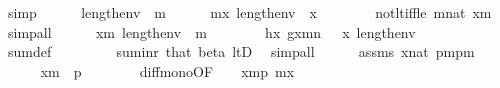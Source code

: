 \begin{isabellebody}
\ simp\isanewline
\ \ \ \ \isamarkupfalse%
\ {\isacartoucheopen}length{\isacharparenleft}{\kern0pt}env{\isacharparenright}{\kern0pt}\ {\isacharequal}{\kern0pt}\ m{\isacartoucheclose}\isanewline
\ \ \ \ \isamarkupfalse%
\ {\isachardoublequoteopen}m{\isasymle}x{\isachardoublequoteclose}\ {\isachardoublequoteopen}length{\isacharparenleft}{\kern0pt}env{\isacharparenright}{\kern0pt}\ {\isasymle}\ x{\isachardoublequoteclose}\isanewline
\ \ \ \ \ \ \isamarkupfalse%
\ not{\isacharunderscore}{\kern0pt}lt{\isacharunderscore}{\kern0pt}iff{\isacharunderscore}{\kern0pt}le\ {\isacartoucheopen}m{\isasymin}nat{\isacartoucheclose}\ {\isacartoucheopen}{\isasymnot}x{\isacharless}{\kern0pt}m{\isacartoucheclose}\ \isamarkupfalse%
\ simp{\isacharunderscore}{\kern0pt}all\isanewline
\ \ \ \ \isamarkupfalse%
\ {\isacartoucheopen}{\isasymnot}x{\isacharless}{\kern0pt}m{\isacartoucheclose}\ {\isacartoucheopen}length{\isacharparenleft}{\kern0pt}env{\isacharparenright}{\kern0pt}\ {\isacharequal}{\kern0pt}\ m{\isacartoucheclose}\isanewline
\ \ \ \ \isamarkupfalse%
\ {}\ {\isacharcolon}{\kern0pt}\ {\isachardoublequoteopen}{\isacharquery}{\kern0pt}h{\isacharbackquote}{\kern0pt}x{\isacharequal}{\kern0pt}\ g{\isacharbackquote}{\kern0pt}{\isacharparenleft}{\kern0pt}x{\isacharhash}{\kern0pt}{\isacharminus}{\kern0pt}m{\isacharparenright}{\kern0pt}{\isacharhash}{\kern0pt}{\isacharplus}{\kern0pt}n{\isachardoublequoteclose}\ \ {\isachardoublequoteopen}{\isasymnot}\ x\ {\isacharless}{\kern0pt}length{\isacharparenleft}{\kern0pt}env{\isacharparenright}{\kern0pt}{\isachardoublequoteclose}\isanewline
\ \ \ \ \ \ \isamarkupfalse%
\ sum{\isacharunderscore}{\kern0pt}def\isanewline
\ \ \ \ \ \ \isamarkupfalse%
\ \ sum{\isacharunderscore}{\kern0pt}inr\ that\ beta\ ltD\ \isamarkupfalse%
\ simp{\isacharunderscore}{\kern0pt}all\isanewline
\ \ \ \ \isamarkupfalse%
\ assms\ {\isacartoucheopen}x{\isasymin}nat{\isacartoucheclose}\ {\isacartoucheopen}p{\isacharequal}{\kern0pt}m{\isacharhash}{\kern0pt}{\isacharplus}{\kern0pt}p{\isacharhash}{\kern0pt}{\isacharminus}{\kern0pt}m{\isacartoucheclose}\isanewline
\ \ \ \ \isamarkupfalse%
\ {\isachardoublequoteopen}x{\isacharhash}{\kern0pt}{\isacharminus}{\kern0pt}m\ {\isacharless}{\kern0pt}\ p{\isachardoublequoteclose}\isanewline
\ \ \ \ \ \ \isamarkupfalse%
\ diff{\isacharunderscore}{\kern0pt}mono{\isacharbrackleft}{\kern0pt}OF\ {\isacharunderscore}{\kern0pt}\ {\isacharunderscore}{\kern0pt}\ {\isacharunderscore}{\kern0pt}\ {\isacartoucheopen}x{\isacharless}{\kern0pt}m{\isacharhash}{\kern0pt}{\isacharplus}{\kern0pt}p{\isacartoucheclose}\ {\isacartoucheopen}m{\isasymle}x{\isacartoucheclose}{\isacharbrackright}{\kern0pt}\ \isamarkupfalse%

\end{isabellebody}
